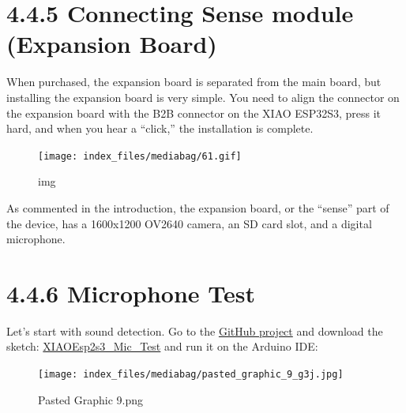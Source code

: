 \documentclass[
  letterpaper,
  DIV=11,
  numbers=noendperiod]{scrreprt}
\begin{document}
\hypertarget{connecting-sense-module-expansion-board-1}{%
\section*{4.4.5 Connecting Sense module (Expansion
Board)}\label{connecting-sense-module-expansion-board-1}}


When purchased, the expansion board is separated from the main board,
but installing the expansion board is very simple. You need to align the
connector on the expansion board with the B2B connector on the XIAO
ESP32S3, press it hard, and when you hear a ``click,'' the installation
is complete.

\begin{figure}[H]

{\centering \texttt{[image: index\_files/mediabag/61.gif]}

}

\caption{img}

\end{figure}

As commented in the introduction, the expansion board, or the ``sense''
part of the device, has a 1600x1200 OV2640 camera, an SD card slot, and
a digital microphone.

\hypertarget{microphone-test-1}{%
\section*{4.4.6 Microphone Test}\label{microphone-test-1}}


Let's start with sound detection. Go to the
\href{https://github.com/Mjrovai/XIAO-ESP32S3-Sense}{GitHub project} and
download the sketch:
\href{https://github.com/Mjrovai/XIAO-ESP32S3-Sense/tree/main/Mic_Test/XiaoEsp32s3_Mic_Test}{XIAOEsp2s3\_Mic\_Test}
and run it on the Arduino IDE:

\begin{figure}[H]

{\centering \texttt{[image: index\_files/mediabag/pasted\_graphic\_9\_g3j.jpg]}

}

\caption{Pasted Graphic 9.png}

\end{figure}
\end{document}
